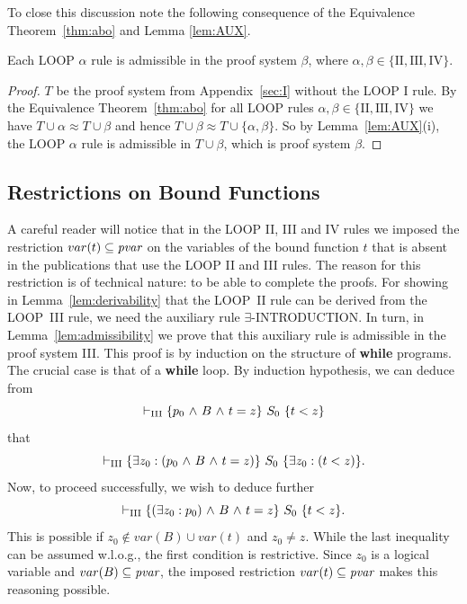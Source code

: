 \documentclass[manuscript, screen, review]{acmart}
\begin{document}
To close this discussion note the following consequence of the Equivalence Theorem~\ref{thm:abo}
and Lemma \ref{lem:AUX}.

\begin{corollary} \label{corr:admiss}
Each {\rm LOOP} $\alpha$ rule is admissible in the proof system $\beta$, 
        where $\alpha, \beta \in \{\mathrm{II, III, IV}\}$.
\end{corollary}


\begin{proof}
  $T$ be the proof system from Appendix~\ref{sec:I} without the LOOP I
  rule.  By the Equivalence Theorem~\ref{thm:abo} for all LOOP rules
  $\alpha, \beta \in \{\mathrm{II, III, IV}\}$ we have
  $T \cup \alpha \approx T \cup \beta$ and hence
  $T \cup \beta \approx T \cup \{\alpha, \beta\}$.  So by
  Lemma~\ref{lem:AUX}(i), the LOOP $\alpha$ rule is 
  admissible in $T \cup \beta$, which is proof system $\beta$.
\HB
\end{proof}



\subsection{Restrictions on Bound Functions}

A careful reader will notice that in the LOOP II, III and IV rules we
imposed the restriction $var(t) \subseteq \mbox{\it pvar}$ on the
variables of the bound function $t$ that is absent in the publications
that use the LOOP II and III rules.
The reason for this restriction is of technical nature: to be able 
to complete the proofs.
For showing in Lemma~\ref{lem:derivability} that the LOOP~II rule can
be derived from the LOOP~III rule, we need the auxiliary rule
$\exists$-INTRODUCTION. In turn, in Lemma~\ref{lem:admissibility}
we prove that this auxiliary rule is admissible in the proof system III.
This proof is by induction on the structure of {\bf while} programs.
The crucial case is that of a {\bf while} loop. By induction hypothesis,
we can deduce from 
\[
 \vdash_{\rm{III}} \mbox{$\{{p_{0} \mbox{$\ \wedge\ $} B \mbox{$\ \wedge\ $} t = z}\}\ {S_0}\ \{{t < z}\}$}
\]
that
\[
 \vdash_{\rm{III}} \mbox{$\{{\mbox{$\exists$} z_0: (p_{0} \mbox{$\ \wedge\ $} B \mbox{$\ \wedge\ $} t = z)}\}\ {S_0}\ \{{\mbox{$\exists$} z_0: (t < z)}\}$}.
\]
Now, to proceed successfully, we wish to deduce further 
\[
 \vdash_{\rm{III}} \mbox{$\{{(\mbox{$\exists$} z_0:p_0) \mbox{$\ \wedge\ $} B \mbox{$\ \wedge\ $} t = z}\}\ {S_0}\ \{{t < z}\}$}.
\]
This is possible if $z_0 \not\in var(B) \cup var(t)$ and $z_0 \neq z$.
While the last inequality can be assumed w.l.o.g., the first condition
is restrictive.
Since $z_0$ is a logical variable and $var(B) \subseteq \mbox{\it pvar}$,
the imposed restriction $var(t) \subseteq \mbox{\it pvar}$ makes this reasoning
possible.
\end{document}
